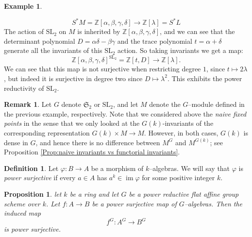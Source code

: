 \documentclass{article}
\theoremstyle{plain}
\newtheorem{Prop}[Th]{Proposition}
\theoremstyle{definition}
\newtheorem{Def}[Th]{Definition}
\newtheorem{Rem}[Th]{Remark}
\newtheorem{Ex}[Th]{Example}
\DeclareMathOperator{\im}{im}
\begin{document}
\begin{Ex}
\begin{enumerate}[(i)]
\[S^*M=\mathbb{Z}[\alpha, \beta, \gamma, \delta] \to \mathbb{Z}[\lambda]=S^*L\]
The action of $\mathrm{SL}_2$ on $M$ is inherited by $\mathbb{Z}[\alpha, \beta, \gamma, \delta]$, and we can see that the determinant polynomial $D=\alpha \delta - \beta \gamma$ and the trace polynomial $t=\alpha+\delta$ generate all the invariants of this $\mathrm{SL}_2$ action. So taking invariants we get a map: 
\[\mathbb{Z}[\alpha, \beta, \gamma, \delta]^{\mathrm{SL}_2}=\mathbb{Z}[t, D] \to \mathbb{Z}[\lambda].\]
We can see that this map is not surjective when restricting degree $1$, since $t\mapsto 2\lambda$, but indeed it is surjective in degree two since $D\mapsto \lambda^2$. This exhibits the power reductivity of $\mathrm{SL}_2$.
    \end{enumerate}
\end{Ex}

\begin{Rem}
    Let $G$ denote $\mathfrak{S}_2$ or $\mathrm{SL}_2$, and let $M$ denote the $G$--module defined in the previous example, respectively. Note that we considered above the \textit{naive fixed points} in the sense that we only looked at the $G(k)$-invariants of the corresponding representation $G(k) \times M \to M$. However, in both cases, $G(k)$ is dense in $G$, and hence there is no difference between $M^G$ and $M^{G(k)}$; see Proposition \ref{Prop:naive invariants vs functorial invariants}.
\end{Rem}

\begin{Def}
    Let $\varphi:B\to A$ be a morphism of $k$--algebras. We will say that $\varphi$ is \textit{power surjective} if every $a\in A$ has $a^k \in \im \varphi$ for some positive integer $k$.
\end{Def}

\begin{Prop}\label{integral2}
    let $k$ be a ring and let $G$ be a  power reductive flat affine group scheme over $k$. Let $f\colon  A\to B$ be a power surjective map of $G$--algebras. Then the induced map 
    \[
    f^G\colon  A^G\to B^G
    \]
    is power surjective.
\end{Prop}
\end{document}
